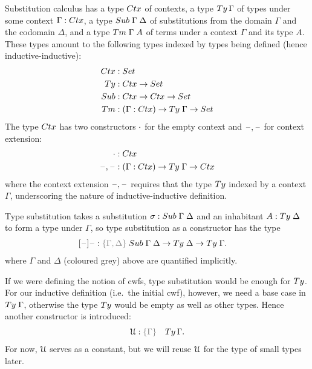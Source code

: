 \documentclass[a4paper,UKenglish,numberwithinsect,cleveref,thm-restate]{lipics-v2021}
\begin{document}
Substitution calculus has a type $\Ctx$ of contexts, a type $\Ty\,\Gamma$ of types under some context $\Gamma : \Ctx$, a type $\Sub\;\Gamma\;\Delta$ of substitutions from the domain $\Gamma$ and the codomain $\Delta$, and a type $\Tm\;\Gamma\;A$ of terms under a context $\Gamma$ and its type $A$. 
These types amount to the following types indexed by types being defined (hence inductive-inductive):
\begin{alignat*}{3}
  \Ctx   & : \Set                   \\
  \Ty    & : \Ctx \to \Set          \\
  \Sub   & : \Ctx \to \Ctx \to \Set \\
  \Tm    & : (\Gamma : \Ctx) \to \Ty\;\Gamma \to \Set
\end{alignat*}
The type $\Ctx$ has two constructors $\cdot$ for the empty context and $\mathord{\hspace{1pt}\text{--}\hspace{1pt}},\mathord{\hspace{1pt}\text{--}\hspace{1pt}}$ for context extension:
\begin{alignat*}{3}
  \emptyctx & : \Ctx \\
  \blank,\blank & : (\Gamma : \Ctx) \to \Ty\;\Gamma \to \Ctx
\end{alignat*}
where the context extension $\mathord{\hspace{1pt}\text{--}\hspace{1pt}},\mathord{\hspace{1pt}\text{--}\hspace{1pt}}$ requires that the type $\Ty$ indexed by a context $\Gamma$, underscoring the nature of inductive-inductive definition.

Type substitution takes a substitution $\sigma : \Sub\;\Gamma\;\Delta$ and an inhabitant $A : \Ty\;\Delta$ to form a type under $\Gamma$, so type substitution as a constructor has the type
\begin{alignat*}{3}
  [\blank]\blank &: \implicit{\Gamma, \Delta} \; \Sub\;\Gamma\;\Delta \to \Ty\;\Delta \to \Ty\;\Gamma.
\end{alignat*}
where $\Gamma$ and $\Delta$ (coloured {\color{gray}grey}) above are quantified implicitly.

If we were defining the notion of cwfs, type substitution would be enough for $\Ty$.
For our inductive definition (i.e.\ the initial cwf), however, we need a base case in $\Ty\;\Gamma$, otherwise the type $\Ty$ would be empty as well as other types.
Hence another constructor is introduced:
\begin{alignat*}{3}
  \UU & : \implicit{\Gamma} & \Ty\, \Gamma.
\end{alignat*}
For now, $\mathcal{U}$ serves as a constant, but we will reuse $\mathcal{U}$ for the type of small types later.
\end{document}
